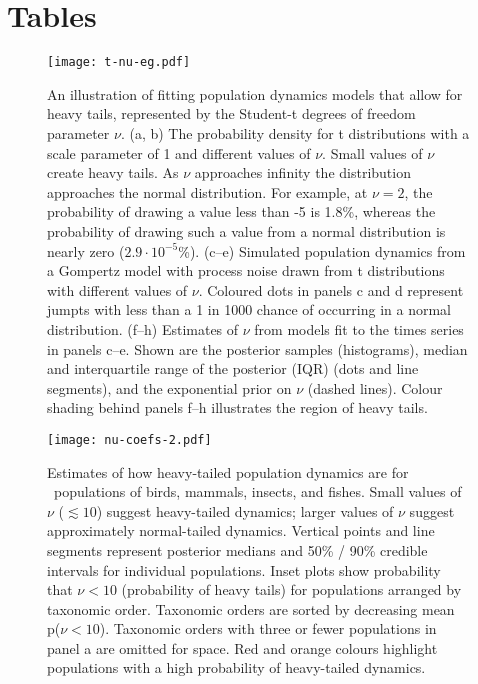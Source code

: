 \section{Tables}



\begin{figure}[htbp]
\begin{center}
\texttt{[image: t-nu-eg.pdf]}
\caption{
An illustration of fitting population dynamics models that allow for heavy tails, represented by the Student-t degrees of freedom parameter $\nu$.
(a, b) The probability density for t distributions with a scale parameter of 1 and different values of $\nu$.
Small values of $\nu$ create heavy tails.
As $\nu$ approaches infinity the distribution approaches the normal distribution.
For example, at $\nu = 2$, the probability of drawing a value less than -5 is 1.8\%, whereas the probability of drawing such a value from a normal distribution is nearly zero ($2.9\cdot10^{-5}$\%).
(c--e) Simulated population dynamics from a Gompertz model with process noise drawn from t distributions with different values of $\nu$.
Coloured dots in panels c and d represent jumpts with less than a 1 in 1000 chance of occurring in a normal distribution.
(f--h) Estimates of $\nu$ from models fit to the times series in panels c--e.
Shown are the posterior samples (histograms), median and interquartile range of the posterior (IQR) (dots and line segments), and the exponential prior on $\nu$ (dashed lines).
Colour shading behind panels f--h illustrates the region of heavy tails.}
\label{fig:didactic}
\end{center}
\end{figure}

\clearpage

\begin{figure}[htbp]
\begin{center}
\texttt{[image: nu-coefs-2.pdf]}
\caption{
Estimates of how heavy-tailed population dynamics are for \nuCoefPopN\ populations of birds, mammals, insects, and fishes.
Small values of $\nu$ ($\lesssim 10$) suggest heavy-tailed dynamics; larger values of $\nu$ suggest approximately normal-tailed dynamics.
Vertical points and line segments represent posterior medians and 50\% / 90\% credible intervals for individual populations.
Inset plots show probability that $\nu < 10$ (probability of heavy tails) for populations arranged by taxonomic order.
Taxonomic orders are sorted by decreasing mean p($\nu < 10$).
Taxonomic orders with three or fewer populations in panel a are omitted for space.
Red and orange colours highlight populations with a high probability of heavy-tailed dynamics.
}
\label{fig:nu-coefs}
\end{center}
\end{figure}

